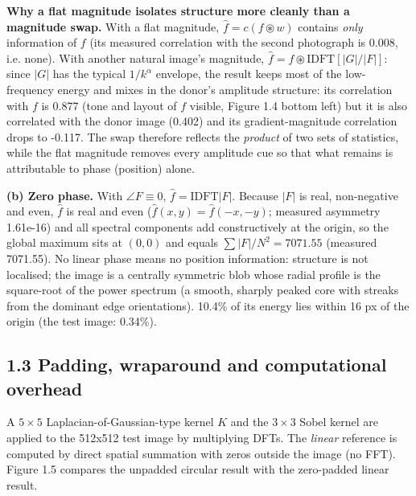 \documentclass[10pt,a4paper]{article}
\begin{document}
\textbf{Why a flat magnitude isolates structure more cleanly than a magnitude swap.} With a flat magnitude, $\hat f=c(f\circledast w)$ contains \textit{only} information of $f$ (its measured correlation with the second photograph is 0.008, i.e. none). With another natural image's magnitude, $\hat f=f\circledast\mathrm{IDFT}[|G|/|F|]$: since $|G|$ has the typical $1/k^\alpha$ envelope, the result keeps most of the low-frequency energy and mixes in the donor's amplitude structure: its correlation with $f$ is 0.877 (tone and layout of $f$ visible, Figure 1.4 bottom left) but it is also correlated with the donor image (0.402) and its gradient-magnitude correlation drops to -0.117. The swap therefore reflects the \textit{product} of two sets of statistics, while the flat magnitude removes every amplitude cue so that what remains is attributable to phase (position) alone.

\textbf{(b) Zero phase.} With $\angle F\equiv 0$, $\hat f=\mathrm{IDFT}|F|$. Because $|F|$ is real, non-negative and even, $\hat f$ is real and even ($\hat f(x,y)=\hat f(-x,-y)$; measured asymmetry 1.61e-16) and all spectral components add constructively at the origin, so the global maximum sits at $(0,0)$ and equals $\sum|F|/N^2=7071.55$ (measured 7071.55). No linear phase means no position information: structure is not localised; the image is a centrally symmetric blob whose radial profile is the square-root of the power spectrum (a smooth, sharply peaked core with streaks from the dominant edge orientations). 10.4\% of its energy lies within 16 px of the origin (the test image: 0.34\%).

\subsection{1.3 Padding, wraparound and computational overhead}
A $5\times5$ Laplacian-of-Gaussian-type kernel $K$ and the $3\times3$ Sobel kernel are applied to the 512x512 test image by multiplying DFTs. The \textit{linear} reference is computed by direct spatial summation with zeros outside the image (no FFT). Figure 1.5 compares the unpadded circular result with the zero-padded linear result.
\end{document}

